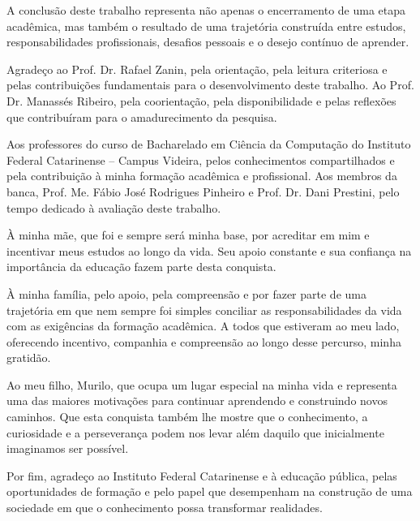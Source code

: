 \begin{agradecimentos}

A conclusão deste trabalho representa não apenas o encerramento de uma etapa acadêmica, mas também o resultado de uma trajetória construída entre estudos, responsabilidades profissionais, desafios pessoais e o desejo contínuo de aprender.

Agradeço ao Prof. Dr. Rafael Zanin, pela orientação, pela leitura criteriosa e pelas contribuições fundamentais para o desenvolvimento deste trabalho. Ao Prof. Dr. Manassés Ribeiro, pela coorientação, pela disponibilidade e pelas reflexões que contribuíram para o amadurecimento da pesquisa.

Aos professores do curso de Bacharelado em Ciência da Computação do Instituto Federal Catarinense -- Campus Videira, pelos conhecimentos compartilhados e pela contribuição à minha formação acadêmica e profissional. Aos membros da banca, Prof. Me. Fábio José Rodrigues Pinheiro e Prof. Dr. Dani Prestini, pelo tempo dedicado à avaliação deste trabalho.

À minha mãe, que foi e sempre será minha base, por acreditar em mim e incentivar meus estudos ao longo da vida. Seu apoio constante e sua confiança na importância da educação fazem parte desta conquista.

À minha família, pelo apoio, pela compreensão e por fazer parte de uma trajetória em que nem sempre foi simples conciliar as responsabilidades da vida com as exigências da formação acadêmica. A todos que estiveram ao meu lado, oferecendo incentivo, companhia e compreensão ao longo desse percurso, minha gratidão.

Ao meu filho, Murilo, que ocupa um lugar especial na minha vida e representa uma das maiores motivações para continuar aprendendo e construindo novos caminhos. Que esta conquista também lhe mostre que o conhecimento, a curiosidade e a perseverança podem nos levar além daquilo que inicialmente imaginamos ser possível.

Por fim, agradeço ao Instituto Federal Catarinense e à educação pública, pelas oportunidades de formação e pelo papel que desempenham na construção de uma sociedade em que o conhecimento possa transformar realidades.

\end{agradecimentos}
